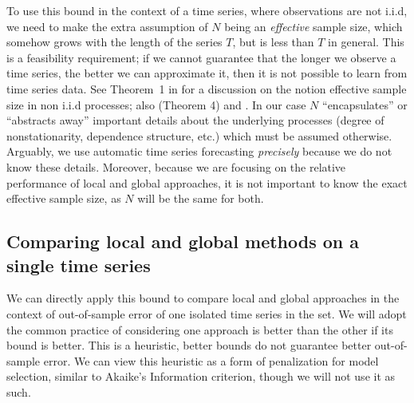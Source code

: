 \documentclass[a4paper]{article}
\theoremstyle{custom}
\begin{document}
To use this bound in the context of a time series, where observations are not i.i.d, we need to make the extra assumption of $N$ being an \textit{effective} sample size, which somehow grows with the length of the series $T$, but is less than $T$ in general. This is a feasibility requirement; if we cannot guarantee that the longer we observe a time series, the better we can approximate it, then it is not possible to learn from time series data. See Theorem~1 in \cite{kuznetsov2016forecasting} for a discussion on the notion effective sample size in non i.i.d processes; also \cite{mcdonald2017nonparametric}(Theorem 4) and \cite{kuznetsov2017generalization}.
In our case $N$ ``encapsulates'' or ``abstracts away'' important details about the underlying processes (degree of nonstationarity, dependence structure, etc.) which must be assumed otherwise. Arguably, we use automatic time series forecasting \textit{precisely} because we do not know these details. Moreover, because we are focusing on the relative performance of local and global approaches, it is not important to know the exact effective sample size, as $N$ will be the same for both.

\subsection{Comparing local and global methods on a single time series}

 We can directly apply this bound to compare local and global approaches in the context of out-of-sample error of one isolated time series in the set. We will adopt the common practice of considering one approach is better than the other if its bound is better. This is a heuristic, better bounds do not guarantee better out-of-sample error. We can view this heuristic as a form of penalization for model selection, similar to Akaike's Information criterion, though we will not use it as such.
\end{document}
